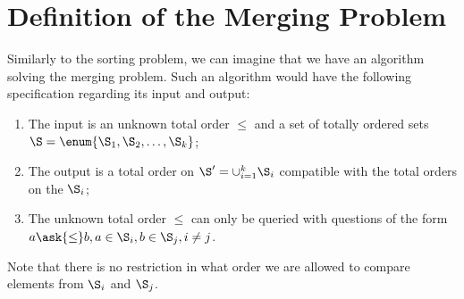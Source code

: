 \section{Definition of the Merging Problem}
\label{tree:merging:def}

Similarly to the sorting problem, we can imagine that we have an algorithm
solving the merging problem. Such an algorithm would have the following
specification regarding its input and output:

\begin{enumerate}
\item The input is an unknown total order \(\le\) and a set of totally ordered
sets \(\S = \enum{\S_1, \S_2, \ldots, \S_k}\);
\item The output is a total order on \(\S' = \cup_{i=1}^{k} \S_i\) compatible with
the total orders on the \(\S_i\);
\item The unknown total order \(\le\) can only be queried with questions of the
form \(a \ask{\le} b, a \in \S_i, b \in \S_j, i \neq j\).
\end{enumerate}

Note that there is no restriction in what order we are allowed to compare
elements from \(\S_i\) and \(\S_j\).

